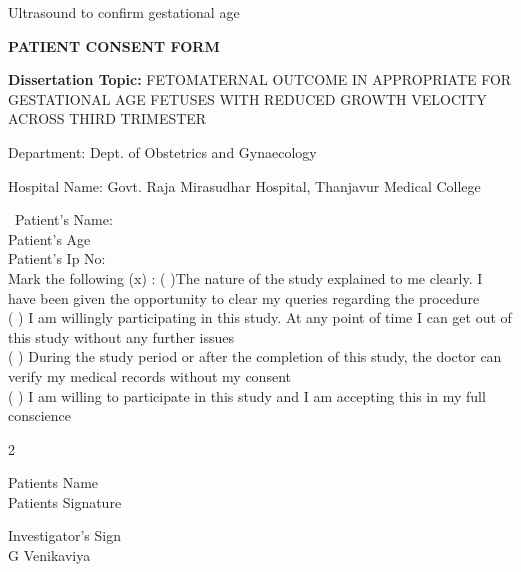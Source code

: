 \documentclass[14pt]{extarticle}
\def\name{G Venikaviya}
\def\study{FETOMATERNAL OUTCOME IN APPROPRIATE FOR GESTATIONAL AGE FETUSES WITH REDUCED GROWTH VELOCITY ACROSS THIRD TRIMESTER}
\begin{document}
Ultrasound to confirm gestational age

\newpage

\begin{center}
    \textbf{PATIENT CONSENT FORM}
\end{center}

\small
\textbf{Dissertation Topic:}
\study

Department: Dept. of Obstetrics and Gynaecology

Hospital Name: Govt. Raja Mirasudhar Hospital, Thanjavur Medical College 

\
Patient’s Name: \\
Patient’s Age \\
Patient's Ip No: \\


Mark the following (x) :
( )The nature of the study explained to me clearly. I have been given the opportunity to clear my queries regarding the procedure \\
( ) I am willingly participating in this study. At any point of time I can get out of this study without any further issues \\
( ) During the study period or after the completion of this study, the doctor can verify my medical records without my consent \\
( ) I am willing to participate in this study and I am accepting this in my full conscience \\

\vspace{30mm}
\begin{multicols}{2}
    \begin{flushleft}
        Patients Name\\
        Patients Signature
    \end{flushleft}

    \begin{flushleft}
        Investigator's Sign\\
        \name
    \end{flushleft}
\end{multicols}
\end{document}
